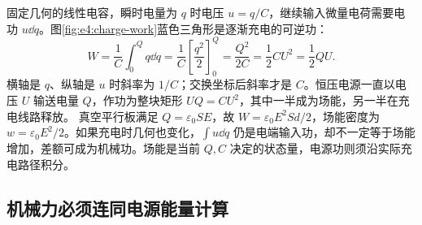固定几何的线性电容，瞬时电量为 $q$ 时电压 $u=q/C$，继续输入微量电荷需要电功 $u\dd q$。图\ref{fig:e4:charge-work}蓝色三角形是逐渐充电的可逆功：
\[
 W=\frac1C\int_0^Q q\dd q
 =\frac1C\left[\frac{q^2}{2}\right]_0^Q
 =\frac{Q^2}{2C}=\frac12CU^2=\frac12QU.
\]
横轴是 $q$、纵轴是 $u$ 时斜率为 $1/C$；交换坐标后斜率才是 $C$。恒压电源一直以电压 $U$ 输送电量 $Q$，作功为整块矩形 $UQ=CU^2$，其中一半成为场能，另一半在充电线路释放。
真空平行板满足 $Q=\varepsilon_0SE$，故 $W=\varepsilon_0E^2Sd/2$，场能密度为 $w=\varepsilon_0E^2/2$。如果充电时几何也变化，$\int u\dd q$ 仍是电端输入功，却不一定等于场能增加，差额可成为机械功。场能是当前 $Q,C$ 决定的状态量，电源功则须沿实际充电路径积分。

\subsection{机械力必须连同电源能量计算}

